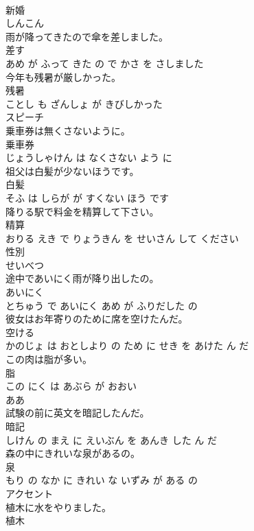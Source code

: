 \documentclass[8pt]{extreport}
\begin{document}
\begin{CJK}{UTF8}{min}
\\	新婚	
\\	しんこん			
\\	雨が降ってきたので傘を差しました。	
\\	差す 
\\	あめ が ふって きた の で かさ を さしました			
\\	今年も残暑が厳しかった。	
\\	残暑 
\\	ことし も ざんしょ が きびしかった			
\\	スピーチ	
\\	乗車券は無くさないように。	
\\	乗車券 
\\	じょうしゃけん は なくさない よう に			
\\	祖父は白髪が少ないほうです。	
\\	白髪 
\\	そふ は しらが が すくない ほう です			
\\	降りる駅で料金を精算して下さい。	
\\	精算 
\\	おりる えき で りょうきん を せいさん して ください			
\\	性別	
\\	せいべつ			
\\	途中であいにく雨が降り出したの。	
\\	あいにく 
\\	とちゅう で あいにく あめ が ふりだした の			
\\	彼女はお年寄りのために席を空けたんだ。	
\\	空ける 
\\	かのじょ は おとしより の ため に せき を あけた ん だ			
\\	この肉は脂が多い。	
\\	脂 
\\	この にく は あぶら が おおい			
\\	ああ	
\\	試験の前に英文を暗記したんだ。	
\\	暗記 
\\	しけん の まえ に えいぶん を あんき した ん だ			
\\	森の中にきれいな泉があるの。	
\\	泉 
\\	もり の なか に きれい な いずみ が ある の			
\\	アクセント	
\\	植木に水をやりました。	
\\	植木 

\end{CJK}
\end{document}
